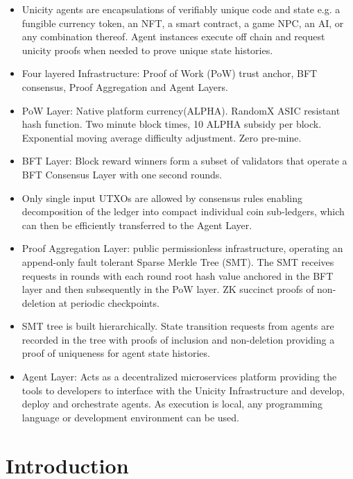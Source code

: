 \documentclass{article}
\begin{document}
\begin{itemize}

  \setlength{\leftmargin}{1em}
  
 \item Unicity agents are encapsulations of verifiably unique code and state e.g. a fungible currency token, an NFT, a smart contract,  a game NPC, an AI, or any combination thereof. Agent instances execute off chain and request unicity proofs when needed to prove unique state histories. 
 \item  Four layered Infrastructure: Proof of Work (PoW) trust anchor, BFT consensus, Proof Aggregation and Agent Layers.
\item PoW Layer: Native platform currency(ALPHA). RandomX ASIC resistant hash function. Two minute block times, 10 ALPHA subsidy per block. Exponential moving average difficulty adjustment. Zero pre-mine. 
\item BFT Layer: Block reward winners form a subset of validators that operate a BFT Consensus Layer with one second rounds. 
\item Only single input UTXOs are allowed by consensus rules enabling decomposition of the ledger into compact individual coin sub-ledgers, which can then be efficiently transferred to the Agent Layer.
\item Proof Aggregation Layer: public permissionless infrastructure, operating an append-only fault tolerant Sparse Merkle Tree (SMT). The SMT receives requests in rounds with each round root hash value anchored in the BFT layer and then subsequently in the PoW layer. ZK succinct proofs of non-deletion at periodic checkpoints.
\item SMT tree is built hierarchically. State transition requests from agents are recorded in the tree with proofs of inclusion and non-deletion providing a proof of uniqueness for agent state histories.
\item Agent Layer: Acts as a decentralized microservices platform providing the tools to developers to interface with the Unicity Infrastructure and develop, deploy and orchestrate agents. As execution is local, any programming language or development environment can be used.

\end{itemize}


\section{Introduction}
\end{document}
